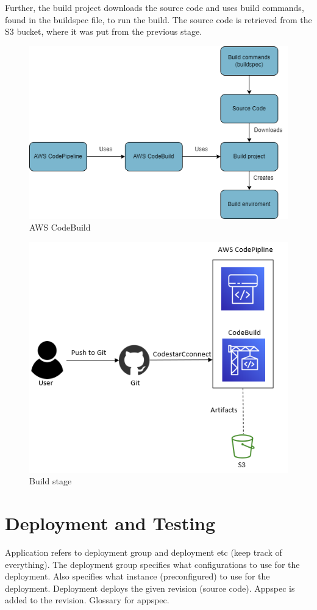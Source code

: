 Further, the build project downloads the source code and uses build commands, found in the \gls{buildspec} file, to run the build. The source code is retrieved from the S3 bucket, where it was put from the previous stage. \cite{CodeBuildProcess}

\vspace{2mm}
\begin{figure}[H]
    \centering
    \includegraphics[scale=0.4]{Images/CodeBuild.drawio.png}
    \caption{AWS CodeBuild} 
    \label{fig: AWS CodeBuild}
\end{figure}

\vspace{2mm}
\begin{figure}[H]
    \centering
    \includegraphics[width=0.6\columnwidth]{Images/aws-piplin-3.png}
    \caption{Build stage}
    \label{fig: Build stage}
\end{figure}

\section{Deployment and Testing}
\label{Deployment and Testing}
Application refers to deployment group and deployment etc (keep track of everything).
The deployment group specifies what configurations to use for the deployment. Also specifies what instance (preconfigured) to use for the deployment.
Deployment deploys the given revision (source code). Appspec is added to the revision. Glossary for appspec.

